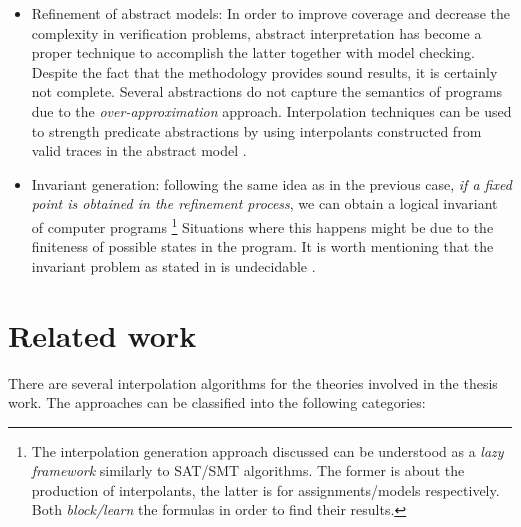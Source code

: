 \begin{itemize}
  \item Refinement of abstract models: In order to improve 
    coverage and decrease the complexity in verification problems,
    abstract interpretation has become a proper technique to 
    accomplish the latter together with model checking. Despite the fact that 
    the methodology provides sound results, it is certainly not complete.
    Several abstractions do not capture the
    semantics of programs due to the \emph{over-approximation} approach.
    Interpolation techniques can be used to strength predicate
    abstractions by using interpolants constructed from valid 
    traces in the abstract model \cite{10.1145/876638.876643,
    10.1007/978-3-540-45069-6_1, 10.1145/982962.964021}.
  \item Invariant generation: following the same idea as in the previous
    case, \emph{if a fixed point is obtained in the refinement process},
    we can obtain a logical invariant of computer programs 
    \footnote{The interpolation
      generation approach discussed can be understood as a \emph{lazy framework}
      similarly to SAT/SMT algorithms. The former is
      about the production of interpolants, the latter is for 
      assignments/models respectively. Both \emph{block/learn} the formulas
    in order to find their results.}
    Situations where this happens might be due to the finiteness of possible 
    states in the program. It is worth mentioning that the 
    invariant problem as stated in \cite{10.1145/363235.363259} 
    is undecidable \cite{10.2307/1990888, 10.1145/371282.371285}.
\end{itemize}

\section{Related work}

There are several interpolation algorithms for the theories
involved in the thesis work. The approaches can be classified
into the following categories:

